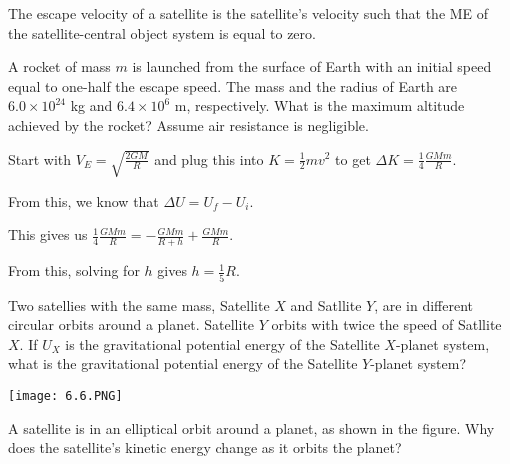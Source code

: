\documentclass[../mech.tex]{subfiles}
\begin{document}
The escape velocity of a satellite is the satellite's velocity such that the ME of the satellite-central object system is equal to zero.

\begin{example}
    A rocket of mass $m$ is launched from the surface of Earth with an initial speed equal to one-half the escape speed. The mass and the radius of Earth are $6.0\times 10^{24}$ kg and $6.4\times 10^6$ m, respectively. What is the maximum altitude achieved by the rocket? Assume air resistance is negligible.

    Start with $V_E = \sqrt{\frac{2GM}{R}}$ and plug this into $K=\frac{1}{2}mv^2$ to get $\Delta K = \frac{1}{4}\frac{GMm}R$.

    From this, we know that $\Delta U = U_f-U_i$.

    This gives us $\frac{1}{4}\frac{GMm}{R}=-\frac{GMm}{R+h}+\frac{GMm}{R}$.

    From this, solving for $h$ gives $h=\frac{1}{5}R$.
\end{example}

\ex Two satellies with the same mass, Satellite $X$ and Satllite $Y$, are in different circular orbits around a planet. Satellite $Y$ orbits with twice the speed of Satllite $X$. If $U_X$ is the gravitational potential energy of the Satellite $X$-planet system, what is the gravitational potential energy of the Satellite $Y$-planet system?

\ex \begin{center}
    \texttt{[image: 6.6.PNG]}
\end{center}
A satellite is in an elliptical orbit around a planet, as shown in the figure. Why does the satellite's kinetic energy change as it orbits the planet?
\end{document}
